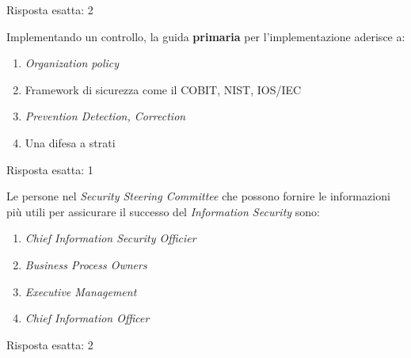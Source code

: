 \begin{Answer} [
  ref={esSA5},
  number={5}
  ]

  \Question Risposta esatta: 2
\end{Answer}


\begin{Exercise} [
  title={Quiz},
  label={esSA6}
  ]

  \Question Implementando un controllo, la guida \textbf{primaria} per 
l'implementazione aderisce a:
\begin{enumerate}
 \item \textit{Organization policy}
 \item Framework di sicurezza come il COBIT, NIST, IOS/IEC
 \item \textit{Prevention Detection, Correction}
 \item Una difesa a strati
\end{enumerate}
  
\end{Exercise}

\begin{Answer} [
  ref={esSA6},
  number={6}
  ]

  \Question Risposta esatta: 1
\end{Answer}


\begin{Exercise} [
  title={Quiz},
  label={esSA7}
  ]

  \Question Le persone nel \textit{Security Steering Committee} che possono
fornire le informazioni più utili per assicurare il successo 
del \textit{Information Security} sono:
\begin{enumerate}
 \item \textit{Chief Information Security Officier}
 \item \textit{Business Process Owners}
 \item \textit{Executive Management}
 \item \textit{Chief Information Officer}
\end{enumerate}
  
\end{Exercise}

\begin{Answer} [
  ref={esSA7},
  number={7}
  ]

  \Question Risposta esatta: 2
\end{Answer}
